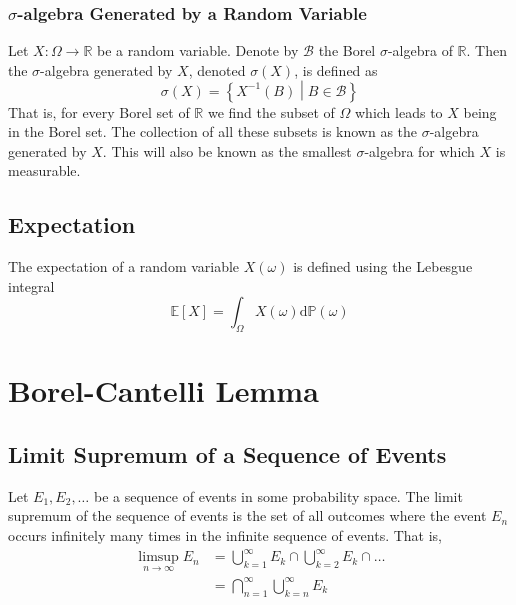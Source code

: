 \documentclass[11pt]{report} %
\begin{document}
\subsubsection{$\sigma$-algebra Generated by a Random Variable}

Let $X: \Omega\to\mathbb{R}$ be a random variable. Denote by $\mathcal{B}$ the Borel $\sigma$-algebra of $\mathbb{R}$. Then the $\sigma$-algebra generated by $X$, denoted $\sigma\left(X\right)$, is defined as
\begin{equation}
\sigma\left(X\right) = \left\{X^{-1}\left(B\right)\middle|B\in\mathcal{B}\right\}
\end{equation}
That is, for every Borel set of $\mathbb{R}$ we find the subset of $\Omega$ which leads to $X$ being in the Borel set. The collection of all these subsets is known as the $\sigma$-algebra generated by $X$. This will also be known as the smallest $\sigma$-algebra for which $X$ is measurable.

\subsection{Expectation}

The expectation of a random variable $X\left(\omega\right)$ is defined using the Lebesgue integral
\begin{equation}
\mathbb{E}\left[X\right] = \int_{\Omega}X\left(\omega\right)\mathrm{d}\mathbb{P}\left(\omega\right)
\end{equation}

\section{Borel-Cantelli Lemma}

\subsection{Limit Supremum of a Sequence of Events}

Let $E_{1}, E_{2}, \dots$ be a sequence of events in some probability space. The limit supremum of the sequence of events is the set of all outcomes where the event $E_{n}$ occurs infinitely many times in the infinite sequence of events. That is,
\begin{align}
\limsup_{n\to\infty}E_{n} &= \bigcup_{k = 1}^{\infty}E_{k} \cap \bigcup_{k = 2}^{\infty}E_{k} \cap \dots \\
&= \bigcap_{n = 1}^{\infty}\bigcup_{k = n}^{\infty}E_{k}
\end{align}
\end{document}
